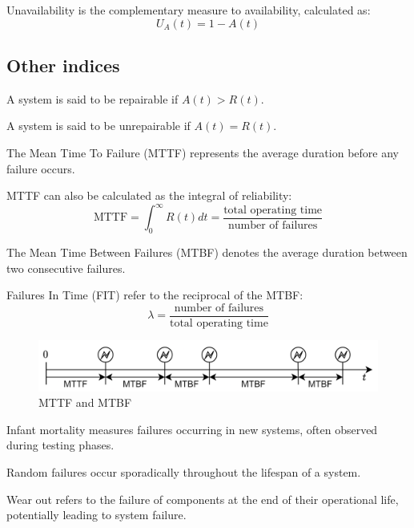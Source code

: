 Unavailability is the complementary measure to availability, calculated as:
\[U_A(t)=1-A(t)\]

\subsection{Other indices}
\begin{definition}
    A system is said to be repairable if $A(t) > R(t)$. 
\end{definition}
\begin{definition}
    A system is said to be unrepairable if $A(t) = R(t)$. 
\end{definition}
\begin{definition}
    The Mean Time To Failure (MTTF) represents the average duration before any failure occurs.
\end{definition}
MTTF can also be calculated as the integral of reliability:
\[\text{MTTF}=\int_0^\infty R(t)dt=\dfrac{\text{total operating time}}{\text{number of failures}}\]
\begin{definition}
    The Mean Time Between Failures (MTBF) denotes the average duration between two consecutive failures.
\end{definition}
\begin{definition}
    Failures In Time (FIT) refer to the reciprocal of the MTBF:
    \[\lambda=\dfrac{\text{number of failures}}{\text{total operating time}}\]
\end{definition}
\begin{figure}[H]
    \centering
    \includegraphics[width=0.75\linewidth]{images/mttb.png}
    \caption{MTTF and MTBF}
\end{figure}
\begin{definition}
    Infant mortality measures failures occurring in new systems, often observed during testing phases.
\end{definition}
\begin{definition}
    Random failures occur sporadically throughout the lifespan of a system.
\end{definition}
\begin{definition}
    Wear out refers to the failure of components at the end of their operational life, potentially leading to system failure. 
\end{definition}

